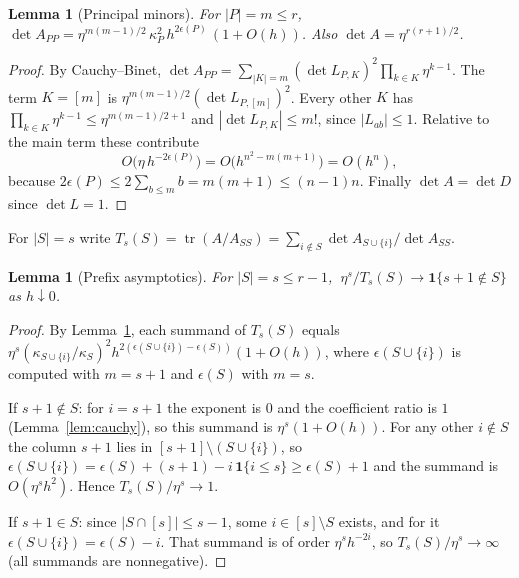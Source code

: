 \documentclass[11pt,a4paper]{article}
\newtheorem{lemma}[theorem]{Lemma}
\theoremstyle{definition}
\newcommand{\tr}{\operatorname{tr}}
\begin{document}
\begin{lemma}[Principal minors]\label{lem:minorsA}
For $|P|=m\le r$, $\det A_{PP}=\eta^{m(m-1)/2}\,\kappa_P^2\,h^{2\epsilon(P)}\,(1+O(h))$. Also $\det A=\eta^{r(r+1)/2}$.
\end{lemma}

\begin{proof}
By Cauchy--Binet, $\det A_{PP}=\sum_{|K|=m}(\det L_{P,K})^2\prod_{k\in K}\eta^{k-1}$. The term $K=[m]$ is $\eta^{m(m-1)/2}(\det L_{P,[m]})^2$. Every other $K$ has $\prod_{k\in K}\eta^{k-1}\le\eta^{m(m-1)/2+1}$ and $|\det L_{P,K}|\le m!$, since $|L_{ab}|\le1$. Relative to the main term these contribute
\[
O\big(\eta\,h^{-2\epsilon(P)}\big)=O\big(h^{n^2-m(m+1)}\big)=O(h^{n}),
\]
because $2\epsilon(P)\le2\sum_{b\le m}b=m(m+1)\le(n-1)n$. Finally $\det A=\det D$ since $\det L=1$.
\end{proof}

For $|S|=s$ write $T_s(S)=\tr(A/A_{SS})=\sum_{i\notin S}\det A_{S\cup\{i\}}/\det A_{SS}$.

\begin{lemma}[Prefix asymptotics]\label{lem:prefix}
For $|S|=s\le r-1$, $\ \eta^s/T_s(S)\to\mathbf 1\{s+1\notin S\}$ as $h\downarrow0$.
\end{lemma}

\begin{proof}
By Lemma~\ref{lem:minorsA}, each summand of $T_s(S)$ equals $\eta^s(\kappa_{S\cup\{i\}}/\kappa_S)^2h^{2(\epsilon(S\cup\{i\})-\epsilon(S))}(1+O(h))$, where $\epsilon(S\cup\{i\})$ is computed with $m=s+1$ and $\epsilon(S)$ with $m=s$.

If $s+1\notin S$: for $i=s+1$ the exponent is $0$ and the coefficient ratio is $1$ (Lemma~\ref{lem:cauchy}), so this summand is $\eta^s(1+O(h))$. For any other $i\notin S$ the column $s+1$ lies in $[s+1]\setminus(S\cup\{i\})$, so $\epsilon(S\cup\{i\})=\epsilon(S)+(s+1)-i\,\mathbf 1\{i\le s\}\ge\epsilon(S)+1$ and the summand is $O(\eta^sh^2)$. Hence $T_s(S)/\eta^s\to1$.

If $s+1\in S$: since $|S\cap[s]|\le s-1$, some $i\in[s]\setminus S$ exists, and for it $\epsilon(S\cup\{i\})=\epsilon(S)-i$. That summand is of order $\eta^sh^{-2i}$, so $T_s(S)/\eta^s\to\infty$ (all summands are nonnegative).
\end{proof}
\end{document}
